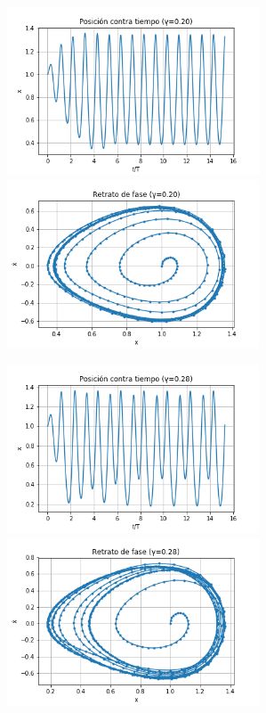 \documentclass[letterpaper,12pt]{article}
\begin{document}
\begin{center}
	\includegraphics[height=5cm]{P1.png} \hspace*{\fill}
    \includegraphics[height=5cm]{R1.png}
\end{center}

\begin{center}
	\includegraphics[height=5cm]{P2.png} \hspace*{\fill}
    \includegraphics[height=5cm]{R2.png}
\end{center}
\end{document}

